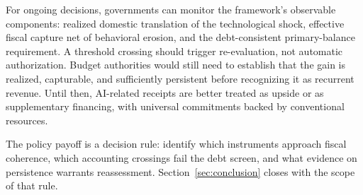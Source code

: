 For ongoing decisions, governments can monitor the framework's observable components: realized domestic translation of the technological shock, effective fiscal capture net of behavioral erosion, and the debt-consistent primary-balance requirement. A threshold crossing should trigger re-evaluation, not automatic authorization. Budget authorities would still need to establish that the gain is realized, capturable, and sufficiently persistent before recognizing it as recurrent revenue. Until then, AI-related receipts are better treated as upside or as supplementary financing, with universal commitments backed by conventional resources.

The policy payoff is a decision rule: identify which instruments approach fiscal coherence, which accounting crossings fail the debt screen, and what evidence on persistence warrants reassessment. Section~\ref{sec:conclusion} closes with the scope of that rule.
